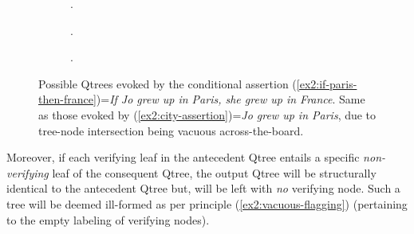 \begin{figure}[H]
	\centering
	\begin{subfigure}[t]{.23\linewidth}
		\centering
		\caption{.}\label{fig2:if-paris-then-france-qtree-polar}
	\end{subfigure}
	\hfill
	\begin{subfigure}[t]{.33\linewidth}
		\centering		{}
		\caption{.}\label{fig2:if-paris-then-france-qtree-wh}
	\end{subfigure}
	\hfill
	\begin{subfigure}[t]{.38\linewidth}
		\centering{}
		\caption{.}\label{fig2:if-paris-then-france-qtree-tiered}
	\end{subfigure}
	\caption{Possible Qtrees evoked by the conditional assertion (\ref{ex2:if-paris-then-france})=\textit{If Jo grew up in Paris, she grew up in France}. Same as those evoked by (\ref{ex2:city-assertion})=\textit{Jo grew up in Paris}, due to tree-node intersection being vacuous across-the-board.}\label{fig2:if-paris-then-france-qtrees}
\end{figure}

 
Moreover, if each verifying leaf in the antecedent Qtree entails a specific \textit{non-verifying} leaf of the consequent Qtree, the output Qtree will be structurally identical to the antecedent Qtree but, will be left with \textit{no} verifying node. Such a tree will be deemed ill-formed as per principle (\ref{ex2:vacuous-flagging}) (pertaining to the empty labeling of verifying nodes).


